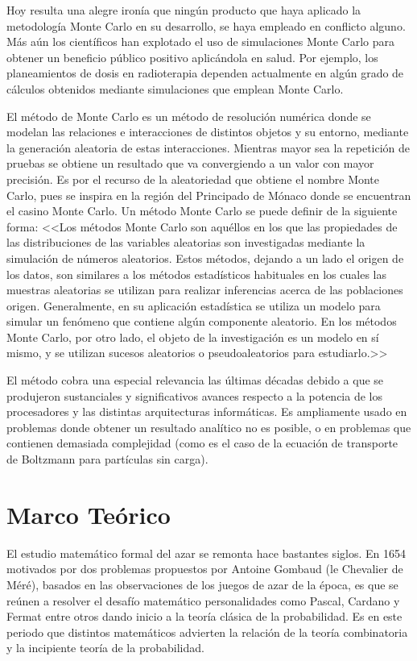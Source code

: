 \documentclass{rbf}
\begin{document}
Hoy resulta una alegre ironía que ningún producto que haya aplicado la metodología Monte Carlo en su desarrollo, se haya empleado en conflicto alguno. Más aún los científicos han explotado el uso de simulaciones Monte Carlo para obtener un beneficio público positivo aplicándola en salud. Por ejemplo, los planeamientos de dosis en radioterapia dependen actualmente en algún grado de cálculos obtenidos mediante simulaciones que emplean Monte Carlo.


El método de Monte Carlo es un método de resolución numérica donde se modelan las relaciones e interacciones de distintos objetos y su entorno, mediante la generación aleatoria de estas interacciones. Mientras mayor sea la repetición de pruebas se obtiene un resultado que va convergiendo a un valor con mayor precisión. Es por el recurso de la aleatoriedad que obtiene el nombre Monte Carlo, pues se inspira en la región del Principado de Mónaco donde se encuentran el casino Monte Carlo.
Un método Monte Carlo se puede definir de la siguiente forma: <<Los métodos Monte Carlo son aquéllos en los que las propiedades de las distribuciones de las variables aleatorias son investigadas mediante la simulación de números aleatorios. Estos métodos, dejando a un lado el origen de los datos, son similares a los métodos estadísticos habituales en los cuales las muestras aleatorias se utilizan para realizar inferencias acerca de las poblaciones origen. Generalmente, en su aplicación estadística se utiliza un modelo para simular un fenómeno que contiene algún componente aleatorio. En los métodos Monte Carlo, por otro lado, el objeto de la investigación es un modelo en sí mismo, y se utilizan sucesos aleatorios o pseudoaleatorios para estudiarlo.>>\cite{Gentle}


El método cobra una especial relevancia las
últimas décadas debido a que se produjeron
sustanciales y significativos avances respecto a la
potencia de los procesadores y las distintas
arquitecturas informáticas. Es ampliamente usado
en problemas donde obtener un resultado
analítico no es posible, o en problemas que
contienen demasiada complejidad (como es el
caso de la ecuación de transporte de Boltzmann
para partículas sin carga).\cite{Kling}
\newpage

\section{Marco Teórico}\label{inter}
El estudio matemático formal del azar se remonta hace bastantes siglos. En 1654 motivados por dos problemas propuestos por Antoine Gombaud (le Chevalier de Méré), basados en las observaciones de los juegos de azar de la época, es que se reúnen a resolver el desafío matemático personalidades como Pascal, Cardano y Fermat entre otros dando inicio a la teoría clásica de la probabilidad. Es en este periodo que distintos matemáticos advierten la relación de la teoría combinatoria y la incipiente teoría de la probabilidad.
\end{document}
